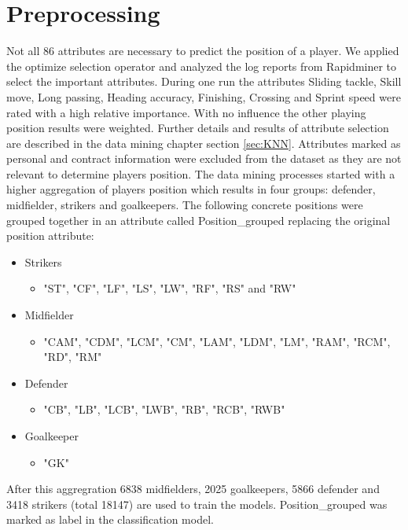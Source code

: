 \section{Preprocessing}
\label{sec:preprocessing}

Not all 86 attributes are necessary to predict the position of a player.
We applied the optimize selection operator and analyzed the log reports from Rapidminer to select the important attributes.
During one run the attributes Sliding tackle, Skill move, Long passing, Heading accuracy, Finishing, Crossing and Sprint speed  were rated with a high relative importance. With no influence the other playing position results were weighted. Further details and results of attribute selection are described in the data mining chapter section \ref{sec:KNN}.\newline
Attributes marked as personal and contract information were excluded from the dataset as they are not relevant to determine players position. 
The data mining processes started with a higher aggregation of players position which results in four groups: defender, midfielder, strikers and goalkeepers. The following concrete positions were grouped together in an attribute called Position\_grouped replacing the original position attribute:
\begin{itemize} 
\item Strikers
\begin{itemize}
\item "ST", "CF", "LF", "LS", "LW", "RF", "RS" and "RW"
\end{itemize}
\item Midfielder
\begin{itemize}
\item "CAM", "CDM", "LCM", "CM", "LAM", "LDM", "LM", "RAM", "RCM", "RD", "RM"
\end{itemize}
\item Defender
\begin{itemize} 
\item "CB", "LB", "LCB", "LWB", "RB", "RCB", "RWB"
\end{itemize}
\item Goalkeeper
\begin{itemize}
\item "GK"
\end{itemize}
\end{itemize}

After this aggregration 6838 midfielders, 2025 goalkeepers, 5866 defender and 3418 strikers (total 18147) are used to train the models. Position\_grouped was marked as label in the classification model.


